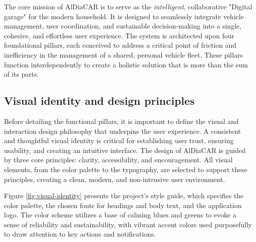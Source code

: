 The core mission of AlDiaCAR is to serve as the \textit{intelligent}, collaborative "Digital garage" for the modern household. It is designed to seamlessly integrate vehicle management, user coordination, and sustainable decision-making into a single, cohesive, and effortless user experience. The system is architected upon four foundational pillars, each conceived to address a critical point of friction and inefficiency in the management of a shared, personal vehicle fleet. These pillars function interdependently to create a holistic solution that is more than the sum of its parts.

\subsection{Visual identity and design principles}

Before detailing the functional pillars, it is important to define the visual and interaction design philosophy that underpins the user experience. A consistent and thoughtful visual identity is critical for establishing user trust, ensuring usability, and creating an intuitive interface. The design of AlDiaCAR is guided by three core principles: clarity, accessibility, and encouragement. All visual elements, from the color palette to the typography, are selected to support these principles, creating a clean, modern, and non-intrusive user environment.

\textgap

Figure \ref{fig:visual-identity} presents the project's style guide, which specifies the color palette, the chosen fonts for headings and body text, and the application logo. The color scheme utilizes a base of calming blues and greens to evoke a sense of reliability and sustainability, with vibrant accent colors used purposefully to draw attention to key actions and notifications.

